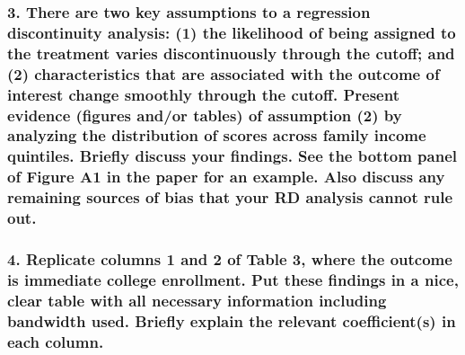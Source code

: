 \documentclass[
]{article}
\begin{document}
\subsubsection{3. There are two key assumptions to a regression
discontinuity analysis: (1) the likelihood of being assigned to the
treatment varies discontinuously through the cutoff; and (2)
characteristics that are associated with the outcome of interest change
smoothly through the cutoff. Present evidence (figures and/or tables) of
assumption (2) by analyzing the distribution of scores across family
income quintiles. Briefly discuss your findings. See the bottom panel of
Figure A1 in the paper for an example. Also discuss any remaining
sources of bias that your RD analysis cannot rule
out.}\label{there-are-two-key-assumptions-to-a-regression-discontinuity-analysis-1-the-likelihood-of-being-assigned-to-the-treatment-varies-discontinuously-through-the-cutoff-and-2-characteristics-that-are-associated-with-the-outcome-of-interest-change-smoothly-through-the-cutoff.-present-evidence-figures-andor-tables-of-assumption-2-by-analyzing-the-distribution-of-scores-across-family-income-quintiles.-briefly-discuss-your-findings.-see-the-bottom-panel-of-figure-a1-in-the-paper-for-an-example.-also-discuss-any-remaining-sources-of-bias-that-your-rd-analysis-cannot-rule-out.}

\subsubsection{4. Replicate columns 1 and 2 of Table 3, where the
outcome is immediate college enrollment. Put these findings in a nice,
clear table with all necessary information including bandwidth used.
Briefly explain the relevant coefficient(s) in each
column.}\label{replicate-columns-1-and-2-of-table-3-where-the-outcome-is-immediate-college-enrollment.-put-these-findings-in-a-nice-clear-table-with-all-necessary-information-including-bandwidth-used.-briefly-explain-the-relevant-coefficients-in-each-column.}
\end{document}
